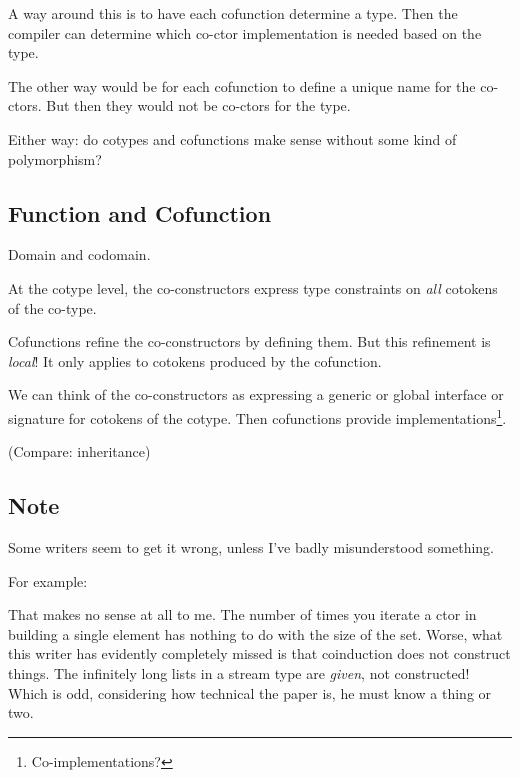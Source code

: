 A way around this is to have each cofunction determine a type. Then
the compiler can determine which co-ctor implementation is needed
based on the type.

The other way would be for each cofunction to define a unique name for
the co-ctors. But then they would not be co-ctors for the type.

Either way: do cotypes and cofunctions make sense without some kind of
polymorphism?

\subsection{Function and Cofunction}

Domain and codomain.

At the cotype level, the co-constructors express type constraints on
\textit{all} cotokens of the co-type.

Cofunctions refine the co-constructors by defining them. But this
refinement is \textit\textit{local}! It only applies to cotokens
produced by the cofunction.

We can think of the co-constructors as expressing a generic or global
interface or signature for cotokens of the cotype. Then cofunctions
provide implementations\footnote{Co-implementations?}.

(Compare: inheritance)

\subsection{Note}

Some writers seem to get it wrong, unless I've badly misunderstood something.

For example:

 That makes no sense at all to
me. The number of times you iterate a ctor in building a single
element has nothing to do with the size of the set. Worse, what this
writer has evidently completely missed is that coinduction does not
construct things. The infinitely long lists in a stream type are
\textit{given}, not constructed! Which is odd, considering how
technical the paper is, he must know a thing or two.

